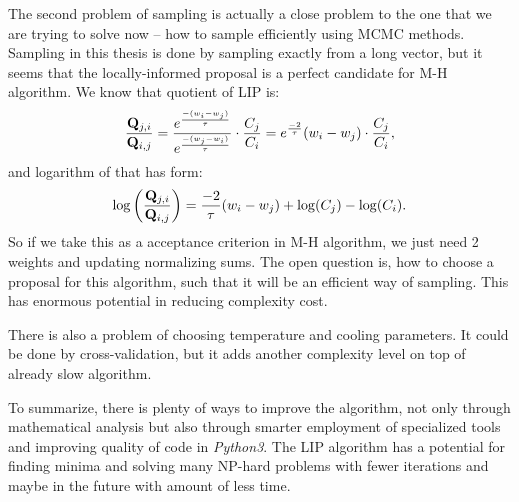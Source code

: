 	The second problem of sampling is actually a close problem to the one that we are trying to solve now -- how to sample efficiently using MCMC methods. Sampling in this thesis is done by sampling exactly from a long vector, but it seems that the locally-informed proposal is a perfect candidate for M-H algorithm. We know that quotient of LIP is:
	\begin{equation*}
		\frac{\mathbf{Q}_{j,i}}{\mathbf{Q}_{i,j}} = \frac{e^\frac{-(w_{i} - w_j)}{\tau}}{e^\frac{-(w_{j} - w_i)}{\tau}} \cdot \frac{C_j}{C_i} =  e^\frac{-2}{\tau}(w_{i} - w_j) \cdot \frac{C_j}{C_i},
	\end{equation*}
	and logarithm of that has form:
	\begin{equation*}
		\log\left(\frac{\mathbf{Q}_{j,i}}{\mathbf{Q}_{i,j}}\right)  = \frac{-2}{\tau}(w_{i} - w_j) + \log(C_j) - \log(C_i).
	\end{equation*}
	So if we take this as a acceptance criterion in M-H algorithm, we just need 2 weights and updating normalizing sums. The open question is, how to choose a proposal for this algorithm, such that it will be an efficient way of sampling. This has enormous potential in reducing complexity cost.
	
	There is also a problem of choosing temperature and cooling parameters. It could be done by cross-validation, but it adds another complexity level on top of already slow algorithm.
	
	To summarize, there is plenty of ways to improve the algorithm, not only through mathematical analysis but also through smarter employment of specialized tools and improving quality of code in \textit{Python3}. The LIP algorithm has a potential for finding minima and solving many NP-hard problems with fewer iterations and maybe in the future with amount of less time.